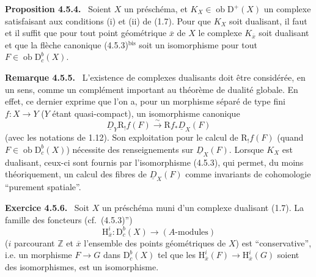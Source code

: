 \documentclass[11pt]{article}
\newenvironment{statement}[1]{\par\medskip\noindent\textbf{#1.}\ }{\par\medskip}
\renewcommand{\H}{\mathrm{H}}
\newcommand{\R}{\mathrm{R}}
\newcommand{\D}{\mathrm{D}}
\newcommand{\Z}{\mathbb{Z}}
\newcommand{\ob}{\operatorname{ob}}
\newcommand{\ol}[1]{\overline{#1}}
\providecommand{\ob}{\operatorname{ob}}
\begin{document}
\begin{statement}{Proposition 4.5.4}
Soient $X$ un préschéma, et $K_X\in\ob\D^+(X)$ un complexe satisfaisant aux conditions (i) et (ii) de (1.7). Pour que $K_X$ soit dualisant, il faut et il suffit que pour tout point géométrique $\ol{x}$ de $X$ le complexe $K_{\ol{x}}$ soit dualisant et que la flèche canonique (4.5.3)$^{\mathrm{bis}}$ soit un isomorphisme pour tout $F\in\ob\D_c^b(X)$.
\end{statement}

\begin{statement}{Remarque 4.5.5}
L'existence de complexes dualisants doit être considérée, en un sens, comme un complément important au théorème de dualité globale. En effet, ce dernier exprime que l'on a, pour un morphisme séparé de type fini $f:X\to Y$ ($Y$ étant quasi-compact), un isomorphisme canonique
\[
\underline{D}_Y\R_!f(F)\xrightarrow{\sim}\R f_*\underline{D}_X(F)
\]
(avec les notations de 1.12). Son exploitation pour le calcul de $\R_!f(F)$ (quand $F\in\ob\D_c^b(X)$) nécessite des renseignements sur $\underline{D}_X(F)$. Lorsque $K_X$ est dualisant, ceux-ci sont fournis par l'isomorphisme (4.5.3), qui permet, du moins théoriquement, un calcul des fibres de $\underline{D}_X(F)$ comme invariants de cohomologie ``purement spatiale''.
\end{statement}

\begin{statement}{Exercice 4.5.6}
Soit $X$ un préschéma muni d'un complexe dualisant (1.7). La famille des foncteurs (cf.~(4.5.3)'')
\[
\H_{\ol{x}}^i:\D_c^b(X)\longrightarrow (A\text{-modules})
\]
($i$ parcourant $\Z$ et $\ol{x}$ l'ensemble des points géométriques de $X$) est ``conservative'', i.e. un morphisme $F\to G$ dans $\D_c^b(X)$ tel que les $\H_{\ol{x}}^i(F)\to\H_{\ol{x}}^i(G)$ soient des isomorphismes, est un isomorphisme.
\end{statement}
\end{document}
